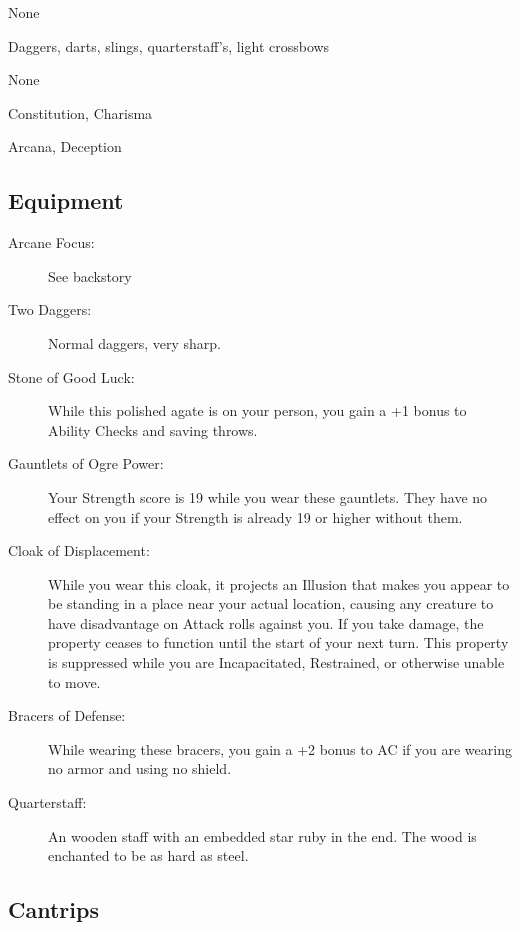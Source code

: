 \documentclass[letterpaper,10pt,twoside,twocolumn,openany]{book}
\begin{document}
\begin{description}[font=\normalfont\textbf,noitemsep,topsep=1ex,leftmargin=1em]
	\item[Armor:] None
	\item[Weapons:] Daggers, darts, slings, quarterstaff's, light crossbows 
	\item[Tools:] None 
\end{description}

\begin{description}[font=\normalfont\textbf,noitemsep,topsep=1ex,leftmargin=1em]
	\item[Saving Throws:] Constitution, Charisma
	\item[Skills:] Arcana, Deception
\end{description}

\subsection{Equipment}

\begin{description}
	\item[Arcane Focus:] See backstory
	\item[Two Daggers:] Normal daggers, very sharp.
	\item[Stone of Good Luck:] While this polished agate is on your person, you gain a +1 bonus to Ability Checks and saving throws.
	\item[Gauntlets of Ogre Power:] Your Strength score is 19 while you wear these gauntlets. They have no effect on you if your Strength is already 19 or higher without them.
	\item[Cloak of Displacement:] While you wear this cloak, it projects an Illusion that makes you appear to be standing in a place near your actual location, causing any creature to have disadvantage on Attack rolls against you. If you take damage, the property ceases to function until the start of your next turn. This property is suppressed while you are Incapacitated, Restrained, or otherwise unable to move.
	\item[Bracers of Defense:] While wearing these bracers, you gain a +2 bonus to AC if you are wearing no armor and using no shield.
	\item[Quarterstaff:] An wooden staff with an embedded star ruby in the end. The wood is enchanted to be as hard as steel.
\end{description}

\subsection{Cantrips}
\end{document}
